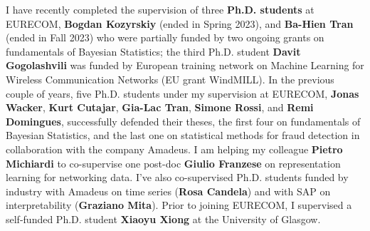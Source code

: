 \documentclass[oneside, a4paper, onecolumn, 10pt]{article}
\begin{document}
I have recently completed the supervision of three {\bf Ph.D. students} at EURECOM, {\bf Bogdan Kozyrskiy} (ended in Spring 2023), and {\bf Ba-Hien Tran} (ended in Fall 2023) who were partially funded by two ongoing grants on fundamentals of Bayesian Statistics; the third Ph.D. student {\bf Davit Gogolashvili} was funded by European training network on Machine Learning for Wireless Communication Networks (EU grant WindMILL).
In the previous couple of years, five Ph.D. students under my supervision at EURECOM, {\bf Jonas Wacker}, {\bf Kurt Cutajar}, {\bf Gia-Lac Tran}, {\bf Simone Rossi}, and {\bf Remi Domingues}, successfully defended their theses, the first four on fundamentals of Bayesian Statistics, and the last one on statistical methods for fraud detection in collaboration with the company Amadeus. %
I am helping my colleague {\bf Pietro Michiardi} to co-supervise one post-doc {\bf Giulio Franzese} on representation learning for networking data.
I've also co-supervised Ph.D. students funded by industry with Amadeus on time series ({\bf Rosa Candela}) and with SAP on interpretability ({\bf Graziano Mita}). %
Prior to joining EURECOM, I supervised a self-funded Ph.D. student {\bf Xiaoyu Xiong} at the University of Glasgow.

\end{document}
